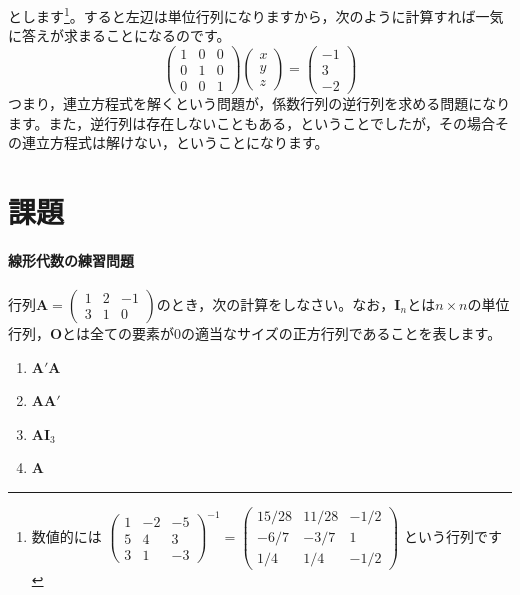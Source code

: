\documentclass{ltjsbook}
\begin{document}
とします\footnote{数値的には
$\begin{pmatrix} 1 & -2 & -5 \\
				5 &  4 &  3 \\
				3 &  1 & -3 \end{pmatrix}^{-1}
=
\begin{pmatrix} 15/28 & 11/28 & -1/2 \\
				-6/7 &  -3/7 &  1 \\
				1/4 &  1/4 & -1/2 \end{pmatrix}
$
という行列です}。すると左辺は単位行列になりますから，次のように計算すれば一気に答えが求まることになるのです。
\[
\begin{pmatrix} 1 & 0 & 0 \\
				0 & 1 & 0 \\
				0 & 0 & 1 \end{pmatrix}
\begin{pmatrix} x \\ y \\ z \end{pmatrix}
=
\begin{pmatrix} -1 \\ 3 \\ -2 \end{pmatrix}
\]
つまり，連立方程式を解くという問題が，係数行列の逆行列を求める問題になります。また，逆行列は存在しないこともある，ということでしたが，その場合その連立方程式は解けない，ということになります。


\section{課題}
\paragraph{線形代数の練習問題}行列$\bm{A}=\begin{pmatrix}1 & 2 & -1\\3 & 1 & 0\end{pmatrix}$のとき，次の計算をしなさい。なお，$\bm{I}_n$とは$n \times n$の単位行列，$\bm{O}$とは全ての要素が0の適当なサイズの正方行列であることを表します。
\begin{enumerate}
    \item $\bm{A}'\bm{A}$
    \item $\bm{AA}'$
    \item $\bm{A}\bm{I}_3$
    \item $\bm{A}$
\end{enumerate}
\end{document}
